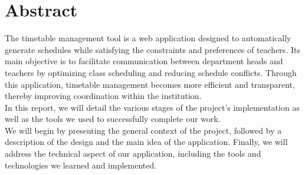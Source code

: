 \chapter*{Abstract}


The timetable management tool is a web application designed to automatically generate schedules while satisfying the constraints and preferences of teachers. Its main objective is to facilitate communication between department heads and teachers by optimizing class scheduling and reducing schedule conflicts. Through this application, timetable management becomes more efficient and transparent, thereby improving coordination within the institution.\\

In this report, we will detail the various stages of the project's implementation as well as the tools we used to successfully complete our work.\\

We will begin by presenting the general context of the project, followed by a description of the design and the main idea of the application. Finally, we will address the technical aspect of our application, including the tools and technologies we learned and implemented.
\newpage





